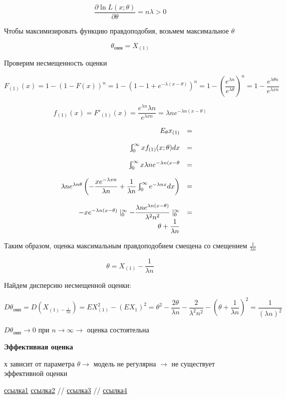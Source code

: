 \documentclass[a4paper,12pt, oneside]{book}
\let\int\varint
\begin{document}
$$
\dfrac{\partial \ln L(x; \theta)}{\partial \theta} = n \lambda > 0
$$

Чтобы максимизировать функцию правдоподобия, возьмем максимальное $ \theta $

$$
\theta_\text{омм} = X_{(1)}
$$

Проверим несмещенность оценки

$$
F_{(1)} (x) = 1 - (1 - F(x))^n = 1-(1-1+e^{- \lambda (x - \theta)})^n = 1 - \left(  \dfrac{e^{\lambda n}}{e^{\lambda \theta}} \right)^n = 1 - \dfrac{e^{\lambda \theta n}}{e^{\lambda x n}}
$$

$$
f_{(1)} (x) = F'_(1)(x) = \dfrac{e^{\lambda n} \lambda n}{e^{\lambda x n}} = \lambda n e^{-\lambda n (x- \theta)}
$$


$$
\begin{array}{rcl}
	E_\theta x_{(1)} &=&\\
	\\
	\int_{0}^{\infty} x f_{(1)} (x; \theta) dx &=&\\
	\\
	\int_{0}^{\infty} x \lambda n e^{-\lambda n (x- \theta} &=&\\
	\\
	\lambda n e^{\lambda n \theta} \left( - \dfrac{x e^{- \lambda x n}}{\lambda n} + \dfrac{1}{\lambda n} \int_{0}^{\infty} e^{-\lambda n x}dx \right) &=& \\
	\\
	  -x e^{-\lambda n (x- \theta)}\mid_0^\infty - \dfrac{\lambda n e^{\lambda n (x - \theta)}}{\lambda^2 n^2}\mid_0^\infty &=&
	  \\
	   \theta + \dfrac{1}{\lambda n}
\end{array}
$$

Таким образом, оценка максимальным правдоподобием смещена со смещением $ \frac{1}{\lambda n} $

$$
\theta = X_{(1)} - \frac{1}{\lambda n}
$$

Найдем дисперсию несмещенной оценки:

$$
D\theta_\text{омп} = D\left( X_{(1) - \frac{1}{\lambda n}}\right) = EX_{(1)}^2 - (EX_{1})^2 = \theta^2 - \dfrac{2 \theta}{\lambda n} - \dfrac{2}{\lambda^2 n^2} - \left( \theta + \dfrac{1}{\lambda n}\right)^2 = \dfrac{1}{(\lambda n)^2}
$$

$D\theta_\text{омп} \to 0  $ при $ n \to \infty \to $ оценка состоятельна

\textbf{Эффективная оценка}

х зависит от параметра $\theta \to$ модель не регулярна $ \to $ не существует эффективной оценки 


\begin{thebibliography}{99}
	 \href{https://towardsdatascience.com/what-is-exponential-distribution-7bdd08590e2a}{ссылка1}
	  \href{https://www.statisticshowto.datasciencecentral.com/exponential-distribution/}{ссылка2}
	  // \href{http://www.ams.jhu.edu/~dan/550.435/notes/COURSENOTES435.pdf}{ссылка3}
	  // \href{http://www.obzh.ru/nad/4-3.html}{ссылка4}
\end{thebibliography}
\end{document}

